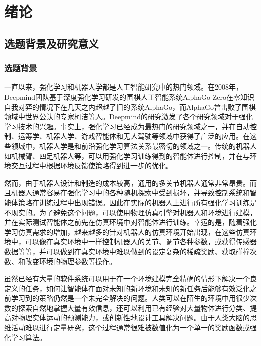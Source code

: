 \chapter{绪论}

    \section{选题背景及研究意义}
    
        \subsection{选题背景}
        一直以来，强化学习和机器人学都是人工智能研究中的热门领域。在2008年，Deepmind团队基于深度强化学习研发的围棋人工智能系统AlphaGo Zero在零知识自我对弈的情况下在几天之内超越了旧的系统AlphaGo，而AlphaGo曾击败了围棋领域中世界公认的专家柯洁等人\cite{silver2018a}。Deepmind的研究激发了各个研究领域对于强化学习技术的兴趣。事实上，强化学习已经成为最热门的研究领域之一，并在自动控制、运筹学、机器人学、游戏智能体和无人驾驶等领域中获得了广泛的应用\cite{dosovitskiy2017carla}。在这些领域中，机器人学是和前沿强化学习算法关系最密切的领域之一。传统的机器人如机械臂、四足机器人等，可以用强化学习训练得到的智能体进行控制，并在与环境交互过程中根据环境反馈使策略得到进一步的优化。

        然而，由于机器人设计和制造的成本较高，通用的多关节机器人通常非常昂贵。而且机器人通常容易在强化学习中的各种随机探索中受到损坏，并导致控制系统和智能体策略在训练过程中出现错误。因此在实际的机器人上进行所有强化学习训练是不现实的\cite{toussaint2018differentiable, todorov2012mujoco}。为了避免这个问题，可以使用物理仿真引擎对机器人和环境进行建模，并在实际测试智能体之前先在仿真环境中对智能体进行训练。幸运的是，随着强化学习仿真需求的增加，越来越多的针对机器人的仿真环境开始出现，在这些仿真环境中，可以像在真实环境中一样控制机器人的关节、调节各种参数，或获得传感器数据等等，并可以做到在真实环境中难以做到的设定复杂的稀疏奖励、获取碰撞次数、和改变环境的物理参数等操作\cite{savva2019habitat}。

        虽然已经有大量的软件系统可以用于在一个环境建模完全精确的情形下解决一个良定义的任务\cite{toussaint2018differentiable}，如何让智能体在面对未知的新环境和未知的新任务后能够有效泛化之前学习到的策略仍然是一个未完全解决的问题\cite{DBLP:journals/corr/abs-1803-11347,DBLP:journals/corr/abs-1905-04819}。人类可以在陌生的环境中用很少次数的探索自然地掌握大量有效信息，还可以利用已有经验对大量物体进行分类、提高对物理实体运动的预测能力，或创新性地设计工具解决问题。由于人类大脑的思维活动难以进行定量研究，这个过程通常很难被数值化为一个单一的奖励函数或强化学习算法。

